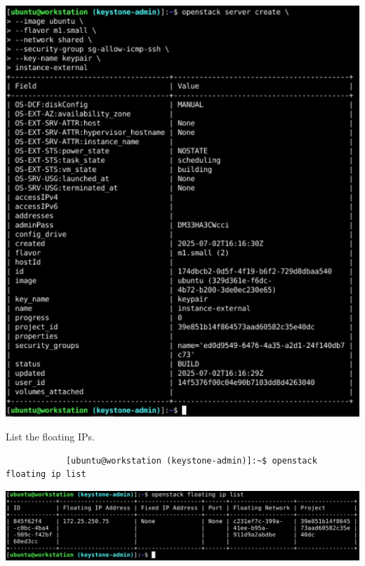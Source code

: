 \documentclass[letterpaper, 12pt]{article}
\begin{document}
\begin{enumerate}
\begin{labstep}
        \begin{center}
            \includegraphics[width=\linewidth]{images/part9/step34.png}
        \end{center}
    \end{labstep}

    \begin{labstep}
        List the floating IPs.
        \begin{lstlisting}
            [ubuntu@workstation (keystone-admin)]:~$ openstack floating ip list
        \end{lstlisting}

        \begin{center}
            \includegraphics[width=\linewidth]{images/part9/step35.png}
        \end{center}
    \end{labstep}


\end{enumerate}
\end{document}
